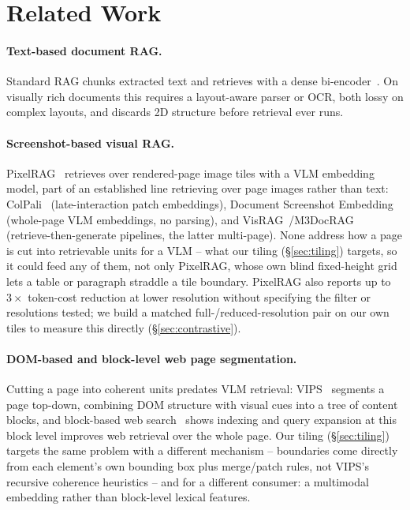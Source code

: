 \section{Related Work}
\label{sec:related_work}

\paragraph{Text-based document RAG.} Standard RAG chunks extracted text and retrieves with a dense bi-encoder~\citep{dpr2020}. On visually rich documents this requires a layout-aware parser or OCR, both lossy on complex layouts, and discards 2D structure before retrieval ever runs.

\paragraph{Screenshot-based visual RAG.} PixelRAG~\citep{pixelrag2026} retrieves over rendered-page image tiles with a VLM embedding model, part of an established line retrieving over page images rather than text: ColPali~\citep{colpali2024} (late-interaction patch embeddings), Document Screenshot Embedding~\citep{dse2024} (whole-page VLM embeddings, no parsing), and VisRAG~\citep{visrag2024}/M3DocRAG~\citep{m3docrag2024} (retrieve-then-generate pipelines, the latter multi-page). None address how a page is cut into retrievable units for a VLM -- what our tiling (\S\ref{sec:tiling}) targets, so it could feed any of them, not only PixelRAG, whose own blind fixed-height grid lets a table or paragraph straddle a tile boundary. PixelRAG also reports up to $3\times$ token-cost reduction at lower resolution without specifying the filter or resolutions tested; we build a matched full-/reduced-resolution pair on our own tiles to measure this directly (\S\ref{sec:contrastive}).

\paragraph{DOM-based and block-level web page segmentation.} Cutting a page into coherent units predates VLM retrieval: VIPS~\citep{vips2003} segments a page top-down, combining DOM structure with visual cues into a tree of content blocks, and block-based web search~\citep{blockwebsearch2004} shows indexing and query expansion at this block level improves web retrieval over the whole page. Our tiling (\S\ref{sec:tiling}) targets the same problem with a different mechanism -- boundaries come directly from each element's own bounding box plus merge/patch rules, not VIPS's recursive coherence heuristics -- and for a different consumer: a multimodal embedding rather than block-level lexical features.

